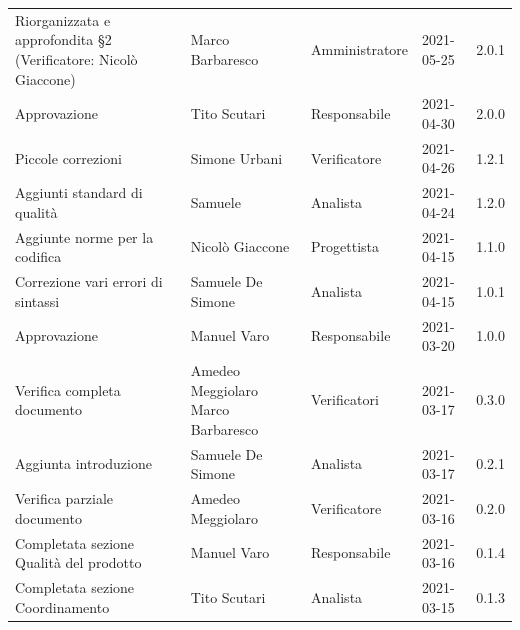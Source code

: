\documentclass[a4paper]{article}
\begin{document}
\begin{center}
\begin{longtable}[!h]{p{160px} p{80px} p{70px} p{55px} p{40px}}
        Riorganizzata e approfondita \S2 \newline (Verificatore: Nicolò Giaccone)  & Marco Barbaresco                            & Amministratore & 2021-05-25    & 2.0.1             \\
        Approvazione                                                               & Tito Scutari                                & Responsabile   & 2021-04-30    & 2.0.0             \\
        Piccole correzioni                                                         & Simone Urbani                               & Verificatore   & 2021-04-26    & 1.2.1             \\
        Aggiunti standard di qualità                                               & Samuele                                     & Analista       & 2021-04-24    & 1.2.0             \\
        Aggiunte norme per la codifica                                             & Nicolò Giaccone                             & Progettista    & 2021-04-15    & 1.1.0             \\
        Correzione vari errori di sintassi                                         & Samuele De Simone                           & Analista       & 2021-04-15    & 1.0.1             \\
        Approvazione                                                               & Manuel Varo                                 & Responsabile   & 2021-03-20    & 1.0.0             \\
        Verifica completa documento                                                & Amedeo Meggiolaro \newline Marco Barbaresco & Verificatori   & 2021-03-17    & 0.3.0             \\
        Aggiunta introduzione                                                      & Samuele De Simone                           & Analista       & 2021-03-17    & 0.2.1             \\
        Verifica parziale documento                                                & Amedeo Meggiolaro                           & Verificatore   & 2021-03-16    & 0.2.0             \\
        Completata sezione Qualità del prodotto                                    & Manuel Varo                                 & Responsabile   & 2021-03-16    & 0.1.4             \\
        Completata sezione Coordinamento                                           & Tito Scutari                                & Analista       & 2021-03-15    & 0.1.3             \\

\end{longtable}
\end{center}
\end{document}
